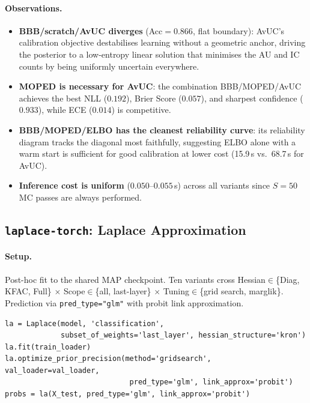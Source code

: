 \documentclass[12pt,a4paper]{article}
\begin{document}
\paragraph{Observations.}
\begin{itemize}[leftmargin=*,topsep=2pt,itemsep=1pt]
  \item \textbf{BBB/scratch/AvUC diverges} (Acc$=0.866$, flat boundary):
    AvUC's calibration objective destabilises learning without a geometric
    anchor, driving the posterior to a low-entropy linear solution that
    minimises the AU and IC counts by being uniformly uncertain everywhere.
  \item \textbf{MOPED is necessary for AvUC}: the combination
    BBB/MOPED/AvUC achieves the best NLL ($0.192$), Brier Score ($0.057$),
    and sharpest confidence ($0.933$), while ECE ($0.014$) is competitive.
  \item \textbf{BBB/MOPED/ELBO has the cleanest reliability curve}:
    its reliability diagram tracks the diagonal most faithfully, suggesting
    ELBO alone with a warm start is sufficient for good calibration at
    lower cost (15.9\,s vs.\ 68.7\,s for AvUC).
  \item \textbf{Inference cost is uniform} ($0.050$--$0.055$\,s) across
    all variants since $S=50$ MC passes are always performed.
\end{itemize}

\subsection{\texttt{laplace-torch}: Laplace Approximation}
\label{sec:la}

\paragraph{Setup.}
Post-hoc fit to the shared MAP checkpoint. Ten variants cross
Hessian$\in$\{Diag, KFAC, Full\} $\times$ Scope$\in$\{all, last-layer\}
$\times$ Tuning$\in$\{grid search, marglik\}.
Prediction via \texttt{pred\_type="glm"} with probit link approximation.

\begin{lstlisting}[caption={Laplace post-hoc workflow.}]
la = Laplace(model, 'classification',
             subset_of_weights='last_layer', hessian_structure='kron')
la.fit(train_loader)
la.optimize_prior_precision(method='gridsearch', val_loader=val_loader,
                             pred_type='glm', link_approx='probit')
probs = la(X_test, pred_type='glm', link_approx='probit')
\end{lstlisting}
\end{document}
